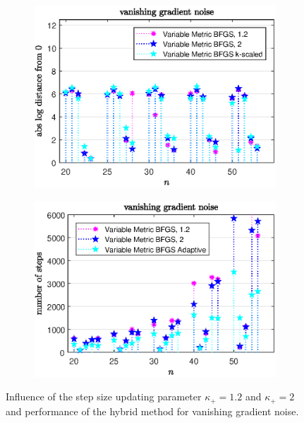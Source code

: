 \vspace{-1.5em}

\begin{figure}[H]
	\begin{subfigure}{0.49\textwidth}
		\includegraphics[width=\textwidth]{Pictures/Plots/vanishing_gradient_noise_compb.eps}%
	\end{subfigure}
	\begin{subfigure}{0.49\textwidth}
		\includegraphics[width=\textwidth]{Pictures/Plots/steps_vanishing_gradient_noise_compb.eps}%
	\end{subfigure}
	\caption{Influence of the step size updating parameter \(\kappa_+ = 1.2\) and \(\kappa_+ =2 \) and performance of the hybrid method for vanishing gradient noise.}%
	\label{fig_van_grad_noise_comp_large}%
\end{figure}

